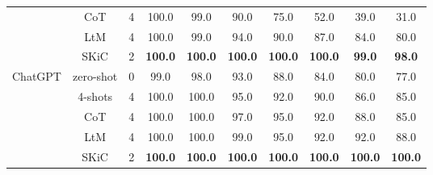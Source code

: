 \begin{table}[th]
\begin{tabular}{c|c|c|cc|ccccc}
                           & CoT  &4        & 100.0                   & 99.0                    & 90.0                    & 75.0                    & 52.0                    & 39.0                     & 31.0                     \\
                           & LtM &4 & 100.0                   & 99.0                    & 94.0                    & 90.0                    & 87.0                    & 84.0                     & 80.0                     \\
                           & SKiC  &2 & \textbf{100.0}          & \textbf{100.0}          & \textbf{100.0}          & \textbf{100.0}          & \textbf{100.0}          & \textbf{99.0}           & \textbf{98.0}            \\  \midrule
\multirow{5}{*}{ChatGPT}   & zero-shot &0           & 99.0                    & 98.0                    & 93.0                    & 88.0                    & 84.0                    & 80.0                     & 77.0                     \\
                           & 4-shots  &4      & 100.0                   & 100.0                   & 95.0                    & 92.0                    & 90.0                    & 86.0                     & 85.0                     \\
                           & CoT    &4       & 100.0                   & 100.0                   & 97.0                    & 95.0                    & 92.0                    & 88.0                     & 85.0                     \\
                           & LtM &4 & 100.0                   & 100.0                   & 99.0                    & 95.0                    & 92.0                    & 92.0                     & 88.0                     \\
                           & SKiC  &2 & \textbf{100.0}          & \textbf{100.0}          & \textbf{100.0}          & \textbf{100.0}          & \textbf{100.0}          & \textbf{100.0}           & \textbf{100.0}       \\ \bottomrule    
\end{tabular}
\end{table}


